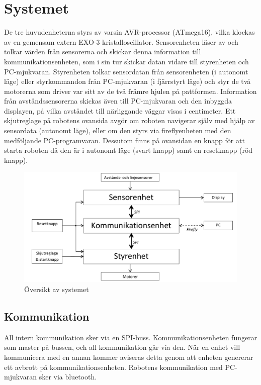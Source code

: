 %

\section{Systemet}

De tre huvudenheterna styrs av varsin AVR-processor (ATmega16), vilka klockas 
av en gemensam extern EXO-3 kristalloscillator. Sensorenheten läser av och 
tolkar värden från sensorerna och skickar denna information till 
kommunikationsenheten, som i sin tur skickar datan vidare till styrenheten 
och PC-mjukvaran. Styrenheten tolkar sensordatan från 
sensorenheten (i autonomt läge) eller styrkommandon från PC-mjukvaran 
(i fjärrstyrt läge) och styr de två motorerna som driver var sitt av de två 
främre hjulen på pattformen. Information från avståndssensorerna skickas även
till PC-mjukvaran och den inbyggda displayen, på vilka avståndet till 
närliggande väggar visas i centimeter.  Ett skjutreglage på robotens ovansida 
avgör om roboten navigerar själv med hjälp av sensordata (autonomt läge), 
eller om den styrs via fireflyenheten med den medföljande PC-programvaran. 
Dessutom finns på ovansidan en knapp för att starta roboten då den är i autonomt läge 
(svart knapp) samt en resetknapp (röd knapp).

\begin{figure}[H]
 \centering
 \includegraphics[angle=0,scale=0.8]{bilder/systemoversikt.pdf}
  \caption{Översikt av systemet}
  \label{fig:system}
\end{figure}


\subsection{Kommunikation}
All intern kommunikation sker via en SPI-buss. Kommunikationsenheten fungerar 
som master på bussen, och all kommunikation går via den. När en enhet vill 
kommunicera med en annan kommer aviseras detta genom att enheten genererar 
ett avbrott på kommunikationsenheten.  Robotens kommunikation med PC-
mjukvaran sker via bluetooth.
